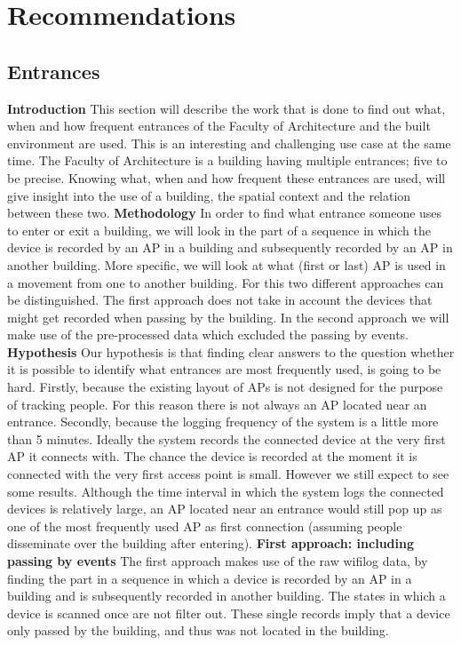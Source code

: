\chapter{Recommendations}\label{recommendations}
\section{Entrances}
\textbf{Introduction}\label{intro}
This section will describe the work that is done to find out what, when and how frequent entrances of the Faculty of Architecture and the built environment are used. This is an interesting and challenging use case at the same time. The Faculty of Architecture is a building having multiple entrances; five to be precise. Knowing what, when and how frequent these entrances are used, will give insight into the use of a building, the spatial context and the relation between these two.
\textbf{Methodology}\label{method}
In order to find what entrance someone uses to enter or exit a building, we will look in the part of a sequence in which the device is recorded by an AP in a building and subsequently recorded by an AP in another building. More specific, we will look at what (first or last) AP is used in a movement from one to another building. For this two different approaches can be distinguished. The first approach does not take in account the devices that might get recorded when passing by the building. In  the second approach we will make use of the pre-processed data which excluded the passing by events.
\textbf{Hypothesis}\label{hypo}
Our hypothesis is that finding clear answers to the question whether it is possible to identify what entrances are most frequently used, is going to be hard. Firstly, because the existing layout of APs is not designed for the purpose of tracking people. For this reason there is not always an AP located near an entrance. Secondly, because the logging frequency of the system is a little more than 5 minutes. Ideally the system records the connected device at the very first AP it connects with. The chance the device is recorded at the moment it is connected with the very first access point is small. However we still expect to see some results. Although the time interval in which the system logs the connected devices is relatively large, an AP located near an entrance would still pop up as one of the most frequently used AP as first connection (assuming people disseminate over the building after entering). 
\textbf{First approach: including passing by events}
The first approach makes use of the raw wifilog data, by finding the part in a sequence in which a device is recorded by an AP in a building and is subsequently recorded in another building. The states in which a device is scanned once are not filter out. These single records imply that a device only passed by the building, and thus was not located in the building. \\\\
